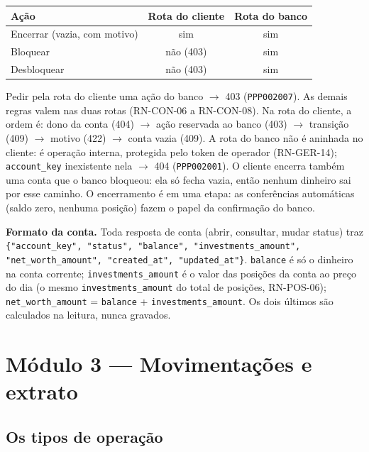 \documentclass[11pt,a4paper]{article}
\newcommand{\dec}{\textbf{[DEC]}}          %
\newcommand{\tb}[1]{\texttt{#1}}           %
\begin{document}
\begin{regras}
  \begin{center}
  \begin{tabular}{@{}lcc@{}}
  \toprule
  \textbf{Ação} & \textbf{Rota do cliente} & \textbf{Rota do banco} \\
  \midrule
  Encerrar (vazia, com motivo) & sim & sim \\
  Bloquear & não (403) & sim \\
  Desbloquear & não (403) & sim \\
  \bottomrule
  \end{tabular}
  \end{center}

  Pedir pela rota do cliente uma ação do banco $\to$ 403 (\tb{PPP002007}). As demais regras valem
  nas duas rotas (RN-CON-06 a RN-CON-08). Na rota do cliente, a ordem é: dono da conta (404) $\to$
  ação reservada ao banco (403) $\to$ transição (409) $\to$ motivo (422) $\to$ conta vazia (409).
  A rota do banco não é aninhada no cliente: é operação interna, protegida pelo token de operador
  (RN-GER-14); \tb{account_key} inexistente nela $\to$ 404 (\tb{PPP002001}). O cliente encerra
  também uma conta que o banco bloqueou: ela só fecha vazia, então nenhum dinheiro sai por esse
  caminho. O encerramento é em uma etapa: as conferências automáticas (saldo zero, nenhuma
  posição) fazem o papel da confirmação do banco.
  \item[RN-CON-12 \dec] \textbf{Formato da conta.} Toda resposta de conta (abrir, consultar, mudar
  status) traz \tb{\{"account_key", "status", "balance", "investments_amount", "net_worth_amount",
  "created_at", "updated_at"\}}. \tb{balance} é só o dinheiro na conta corrente;
  \tb{investments_amount} é o valor das posições da conta ao preço do dia (o mesmo
  \tb{investments_amount} do total de posições, RN-POS-06); \tb{net_worth_amount} = \tb{balance} +
  \tb{investments_amount}. Os dois últimos são calculados na leitura, nunca gravados.
\end{regras}

\section{Módulo 3 --- Movimentações e extrato}

\subsection{Os tipos de operação}
\end{document}
